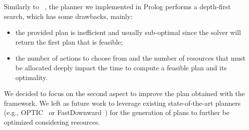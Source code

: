 
Similarly to ~\cite{saccon2023prolog}, the planner we implemented in Prolog performs a depth-first search, which has some drawbacks, mainly:
\begin{itemize}
    \item the provided plan is inefficient and usually sub-optimal since the solver will return the first plan that is feasible;
    \item the number of actions to choose from and the number of resources that must be allocated deeply impact the time to compute a feasible plan and its optimality.
\end{itemize}
We decided to focus on the second aspect to improve the plan obtained with the framework. We left as future work to leverage existing state-of-the-art planners (e.g., OPTIC~\cite{DBLP:conf/aips/BentonCC12} or FastDownward~\cite{DBLP:journals/jair/Helmert06}) for the generation of plans to further be optimized considering resources.